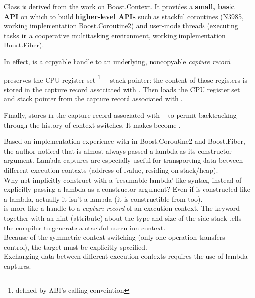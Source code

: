 Class \ectx is derived from the work on Boost.Context\cite{bcontext}. It
provides a {\bfseries small, basic API} on which to build {\bfseries
higher-level APIs} such as stackful coroutines (N3985\cite{N3985}, working
implementation Boost.Coroutine2\cite{bcoroutine2}) and user-mode threads
(executing tasks in a cooperative multitasking environment, working
implementation Boost.Fiber\cite{bfiber}).

In effect,  is a copyable handle to an underlying,
noncopyable \emph{capture record}.

 preserves the CPU register set
\footnote{defined by ABI's calling conveintion} + stack pointer: the content of
those registers is stored in the capture record associated with
. Then  loads the CPU register
set and stack pointer from the capture record associated with .

Finally, 
stores  in the capture record
associated with  -- to permit backtracking through the history of
context switches. It makes  become .

Based on implementation experience with  in
Boost.Coroutine2\cite{bcoroutine2} and Boost.Fiber\cite{bfiber}, the author
noticed that  is almost always passed a lambda as its
constructor argument. Lambda captures are especially useful for transporting
data between different execution contexts (address of lvalue, residing on
stack/heap).\\
Why not implicitly construct \ectx with a 'resumable lambda'-like
syntax\cite{N4244}, instead of explicitly passing a lambda as a constructor
argument? Even if \ectx is constructed like a lambda, actually it isn't a
lambda (it is constructible from \ectxcurrent too).\\
\ectx is more like a handle to a \emph{capture record} of an execution
context.
The keyword \resumable together with an hint (attribute) about the type and size
of the side stack tells the compiler to generate a stackful execution context.\\
Because of the symmetric context switching (only one operation transfers
control), the target  must be explicitly specified.\\
Exchanging data between different execution contexts requires the use of lambda
captures.

